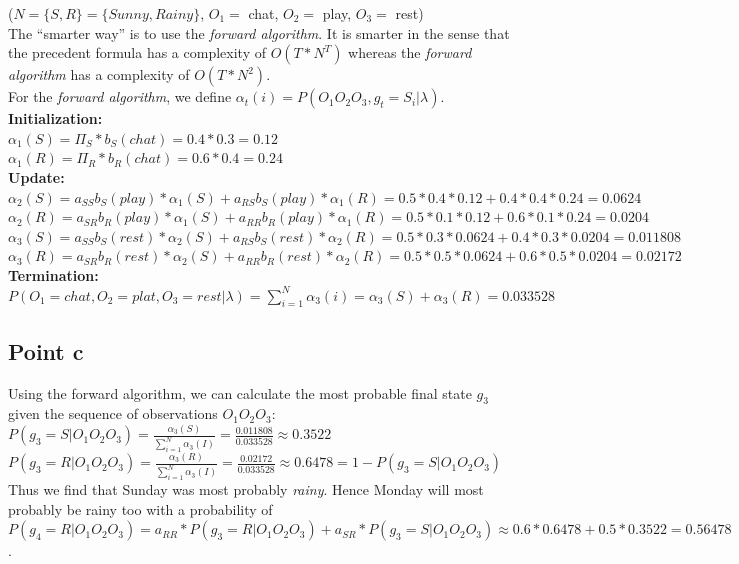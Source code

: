 \documentclass[11pt]{article}
\begin{document}
($N = \{S, R\} = \{Sunny, Rainy\}$, $O_1=$ chat, $O_2=$ play, $O_3=$ rest) \\
The ``smarter way'' is to use the \textit{forward algorithm}. It is smarter in the sense that the precedent formula has a complexity of $O(T*N^T)$ whereas the \textit{forward algorithm} has a complexity of $O(T*N^2)$. \\
For the \textit{forward algorithm}, we define $\alpha_t(i) = P(O_1O_2O_3, g_t=S_i | \lambda)$. \\
\textbf{Initialization:} \\
$\alpha_1(S) = \Pi_S*b_S(chat) = 0.4*0.3 = 0.12$ \\
$\alpha_1(R) = \Pi_R*b_R(chat) = 0.6*0.4 = 0.24$ \\
\textbf{Update:} \\
$\alpha_2(S) = a_{SS}b_S(play)*\alpha_1(S) + a_{RS}b_S(play)*\alpha_1(R) = 0.5*0.4*0.12+0.4*0.4*0.24 = 0.0624$ \\
$\alpha_2(R) = a_{SR}b_R(play)*\alpha_1(S) + a_{RR}b_R(play)*\alpha_1(R) = 0.5*0.1*0.12 + 0.6*0.1*0.24 = 0.0204$ \\
$\alpha_3(S) = a_{SS}b_S(rest)*\alpha_2(S) + a_{RS}b_S(rest)*\alpha_2(R) = 0.5*0.3*0.0624 + 0.4*0.3*0.0204 = 0.011808 $ \\
$\alpha_3(R) = a_{SR}b_R(rest)*\alpha_2(S) + a_{RR}b_R(rest)*\alpha_2(R) = 0.5*0.5*0.0624 + 0.6*0.5*0.0204 = 0.02172$ \\
\textbf{Termination:} \\
$P(O_1=chat,O_2=plat, O_3=rest | \lambda) = \sum_{i=1}^N \alpha_3(i) = \alpha_3(S) + \alpha_3(R) = \mathbf{0.033528}$

\subsection{Point c}
Using the forward algorithm, we can calculate the most probable final state $g_3$ given the sequence of observations $O_1O_2O_3$: $P(g_3 = S | O_1O_2O_3) = \frac{\alpha_3(S)}{\sum_{i=1}^N \alpha_3(I)} = \frac{0.011808}{0.033528} \approx 0.3522$ \\
$P(g_3 = R | O_1O_2O_3) = \frac{\alpha_3(R)}{\sum_{i=1}^N \alpha_3(I)} = \frac{0.02172}{0.033528} \approx 0.6478 = 1-P(g_3 = S | O_1O_2O_3)$ \\
Thus we find that Sunday was most probably \textit{rainy}. Hence Monday will most probably be rainy too with a probability of $P(g_4=R | O_1O_2O_3) = a_{RR} * P(g_3 = R | O_1O_2O_3) + a_{SR} * P(g_3 = S | O_1O_2O_3) \approx 0.6 * 0.6478 + 0.5 * 0.3522 =\mathbf{0.56478}$.
\end{document}
